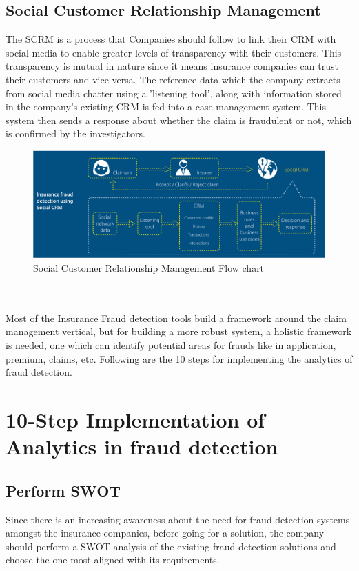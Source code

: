 \documentclass[sigconf]{acmart}
\begin{document}
\subsection{Social Customer Relationship Management}
The SCRM is a process that Companies should follow to link their CRM with social media to enable greater levels of transparency with their customers. This transparency is mutual in nature since it means insurance companies can trust their customers and vice-versa. The reference data which the company extracts from social media chatter using a 'listening tool', along with information stored in the company's existing CRM is fed into a case management system. This system then sends a response about whether the claim is fraudulent or not, which is confirmed by the investigators. \cite{link7}
\begin{figure}
  \includegraphics[width=\linewidth]{images/SCRM_image1.png}
  \caption{Social Customer Relationship Management Flow chart}
  \label{fig:Social Customer Relationship Management Flow chart}
\end{figure}
\\
\\
Most of the Insurance Fraud detection tools build a framework around the claim management vertical, but for building a more robust system, a holistic framework is needed, one which can identify potential areas for frauds like in application, premium, claims, etc. Following are the 10 steps for implementing the analytics of fraud detection.

\section{10-Step Implementation of Analytics in fraud detection}
\subsection{Perform SWOT}
Since there is an increasing awareness about the need for fraud detection systems amongst the insurance companies, before going for a solution, the company should perform a SWOT analysis of the existing fraud detection solutions and choose the one most aligned with its requirements.
\end{document}
